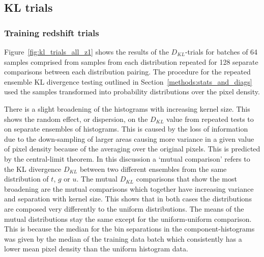 \documentclass[twocolumn]{article}
\numberwithin{equation}{section}
\begin{document}

\subsection{KL trials}\label{sec:kl_trials}


\subsubsection{Training redshift trials}

Figure~\ref{fig:kl_trials_all_z1} shows the results of the $D_{KL}$-trials for batches of 64 samples comprised from samples
from each distribution repeated for 128 separate comparisons between each distribution pairing. The procedure for the 
repeated ensemble KL divergence testing outlined in Section~\ref{methods:stats_and_diags} used the samples transformed into 
probability distributions over the pixel density.

There is a slight broadening of the histograms with increasing kernel size. This shows the random effect, or dispersion, 
on the $D_{KL}$ value from repeated tests to on separate ensembles of histograms. This is caused by the loss of information 
due to the down-sampling of larger areas causing more variance in a given value of pixel density because of the averaging 
over the original pixels. This is predicted by the central-limit theorem. In this discussion a `mutual comparison' 
refers to the KL divergence $D_{KL}$ between two different ensembles from the same distribution of $t$, $g$ or $u$. The 
mutual $D_{KL}$ comparisons that show the most broadening are the mutual comparisons which together have increasing 
variance and separation with kernel size. This shows that in both cases the distributions are composed very differently 
to the uniform distributions. The means of the mutual distributions stay the same except for the uniform-uniform comparison. 
This is because the median for the bin separations in the component-histograms was given by the median of the training data 
batch which consistently has a lower mean pixel density than the uniform histogram data. 
\end{document}
